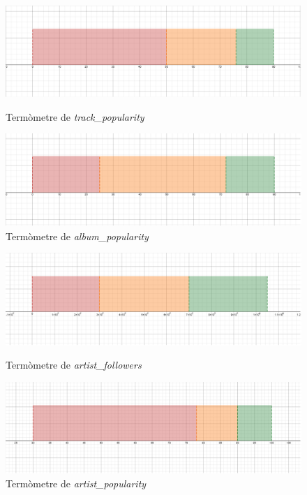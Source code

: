 \begin{figure}[H]
\centering
    \begin{minipage}{.49\textwidth}
        \centering
	\includegraphics[width=0.95\linewidth]{Images/5_TLP/track_popularity_term.png}
        \caption{Termòmetre de \emph{track\_popularity}}
        \label{fig:5_TLP:trackpopularity}
    \end{minipage}%
    \begin{minipage}{.49\textwidth}
        \centering
        \includegraphics[width=0.95\linewidth]{Images/5_TLP/album_popularity_term.png}
        \caption{Termòmetre de \emph{album\_popularity}}
        \label{fig:5_TLP:albumpopularity}
    \end{minipage}%
\end{figure}

\begin{figure}[H]
\centering
    \begin{minipage}{.49\textwidth}
        \centering
        \includegraphics[width=0.95\linewidth]{Images/5_TLP/artist_followers_term.png}
        \caption{Termòmetre de \emph{artist\_followers}}
        \label{fig:5_TLP:artistfollowers}
    \end{minipage}%
    \begin{minipage}{.49\textwidth}
        \centering
        \includegraphics[width=0.95\linewidth]{Images/5_TLP/artist_popularity_term.png}
        \caption{Termòmetre de \emph{artist\_popularity}}
        \label{fig:5_TLP:artistpopularity}
    \end{minipage}%
\end{figure}

